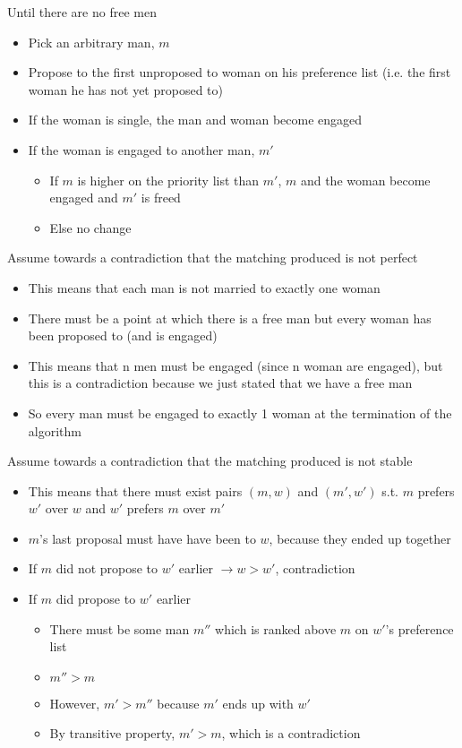 \algorithm
{
    \item Until there are no free men
    \begin{itemize}
        \item Pick an arbitrary man, $m$
        \item Propose to the first unproposed to woman on his preference list (i.e. the first woman he has not yet proposed to)
        \item If the woman is single, the man and woman become engaged
        \item If the woman is engaged to another man, $m'$
        \begin {itemize}
            \item If $m$ is higher on the priority list than $m'$, $m$ and the woman become engaged and $m'$ is freed
            \item Else no change
        \end{itemize}
    \end{itemize}
}
{
    \item Assume towards a contradiction that the matching produced is not perfect
    \begin{itemize}
        \item This means that each man is not married to exactly one woman
        \item There must be a point at which there is a free man but every woman has been proposed to (and is engaged)
        \item This means that n men must be engaged (since n woman are engaged), but this is a contradiction because we just stated that we have a free man
        \item So every man must be engaged to exactly 1 woman at the termination of the algorithm
    \end{itemize}
    \item Assume towards a contradiction that the matching produced is not stable
    \begin{itemize}
        \item This means that there must exist pairs $(m, w)$ and $(m', w')$ s.t. $m$ prefers $w'$ over $w$ and $w'$ prefers $m$ over $m'$
        \item $m$'s last proposal must have have been to $w$, because they ended up together
        \item If $m$ did not propose to $w'$ earlier $\rightarrow w > w'$, contradiction 
        \item If $m$ did propose to $w'$ earlier
        \begin{itemize}
            \item There must be some man $m''$ which is ranked above $m$ on $w'$'s preference list
            \item $m'' > m$
            \item However, $m' > m''$ because $m'$ ends up with $w'$
            \item By transitive property, $m' >m$, which is a contradiction
        \end{itemize}
    \end{itemize}
}
